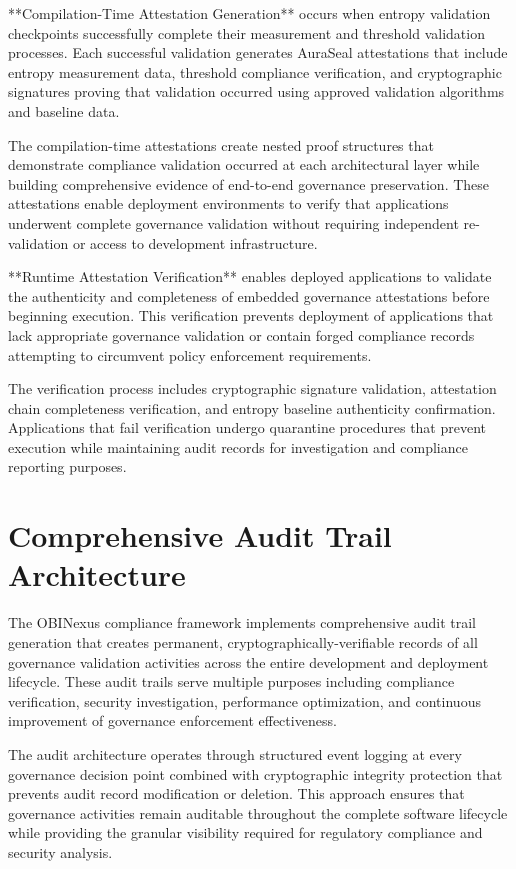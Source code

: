 **Compilation-Time Attestation Generation** occurs when entropy validation checkpoints successfully complete their measurement and threshold validation processes. Each successful validation generates AuraSeal attestations that include entropy measurement data, threshold compliance verification, and cryptographic signatures proving that validation occurred using approved validation algorithms and baseline data.

The compilation-time attestations create nested proof structures that demonstrate compliance validation occurred at each architectural layer while building comprehensive evidence of end-to-end governance preservation. These attestations enable deployment environments to verify that applications underwent complete governance validation without requiring independent re-validation or access to development infrastructure.

**Runtime Attestation Verification** enables deployed applications to validate the authenticity and completeness of embedded governance attestations before beginning execution. This verification prevents deployment of applications that lack appropriate governance validation or contain forged compliance records attempting to circumvent policy enforcement requirements.

The verification process includes cryptographic signature validation, attestation chain completeness verification, and entropy baseline authenticity confirmation. Applications that fail verification undergo quarantine procedures that prevent execution while maintaining audit records for investigation and compliance reporting purposes.

\section{Comprehensive Audit Trail Architecture}

The OBINexus compliance framework implements comprehensive audit trail generation that creates permanent, cryptographically-verifiable records of all governance validation activities across the entire development and deployment lifecycle. These audit trails serve multiple purposes including compliance verification, security investigation, performance optimization, and continuous improvement of governance enforcement effectiveness.

The audit architecture operates through structured event logging at every governance decision point combined with cryptographic integrity protection that prevents audit record modification or deletion. This approach ensures that governance activities remain auditable throughout the complete software lifecycle while providing the granular visibility required for regulatory compliance and security analysis.

